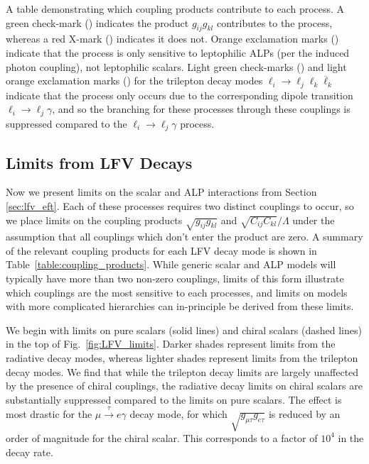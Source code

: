 {\begin{table}[t!]
\caption[A table demonstrating which LFV coupling products contribute to each LFV lepton decay.]{A table demonstrating which coupling products contribute to each process. A green check-mark (\ccmark) indicates the product $g_{ij}g_{kl}$ contributes to the process, whereas a red X-mark (\cxmark) indicates it does not. Orange exclamation marks (\cemark) indicate that the process is only sensitive to leptophilic ALPs (per the induced photon coupling), not leptophilic scalars. Light green check-marks (\lcmark) and light orange exclamation marks (\lemark) for the trilepton decay modes $\ell_i\rightarrow \ell_j \ell_k\overline{\ell}_k$ indicate that the process only occurs due to the corresponding dipole transition $\ell_i \rightarrow \ell_j \gamma$, and so the branching for these processes through these couplings is suppressed compared to the $\ell_i \rightarrow \ell_j\gamma$ process.}
\label{table:coupling_products}
\end{table}

\subsection{Limits from LFV Decays}\label{sec:lfv_limits}

Now we present limits on the scalar and ALP interactions from Section \ref{sec:lfv_eft}. Each of these processes requires two distinct couplings to occur, so we place limits on the coupling products $\sqrt{g_{ij}g_{kl}}$ and $\sqrt{C_{ij}C_{kl}}/\Lambda$ under the assumption that all couplings which don't enter the product are zero. A summary of the relevant coupling products for each LFV decay mode is shown in Table~\ref{table:coupling_products}. While generic scalar and ALP models will typically have more than two non-zero couplings, limits of this form illustrate which couplings are the most sensitive to each processes, and limits on models with more complicated hierarchies can in-principle be derived from these limits. 

We begin with limits on pure scalars (solid lines) and chiral scalars (dashed lines) in the top of Fig.~\ref{fig:LFV_limits}. Darker shades represent limits from the radiative decay modes, whereas lighter shades represent limits from the trilepton decay modes. We find that while the trilepton decay limits are largely unaffected by the presence of chiral couplings, the radiative decay limits on chiral scalars are substantially suppressed compared to the limits on pure scalars. The effect is most drastic for the $\mu\overset{\tau}{\longrightarrow} e\gamma$ decay mode, for which $\sqrt{g_{\mu\tau}g_{e\tau}}$ is reduced by an order of magnitude for the chiral scalar. This corresponds to a factor of $10^4$ in the decay rate. 


}
